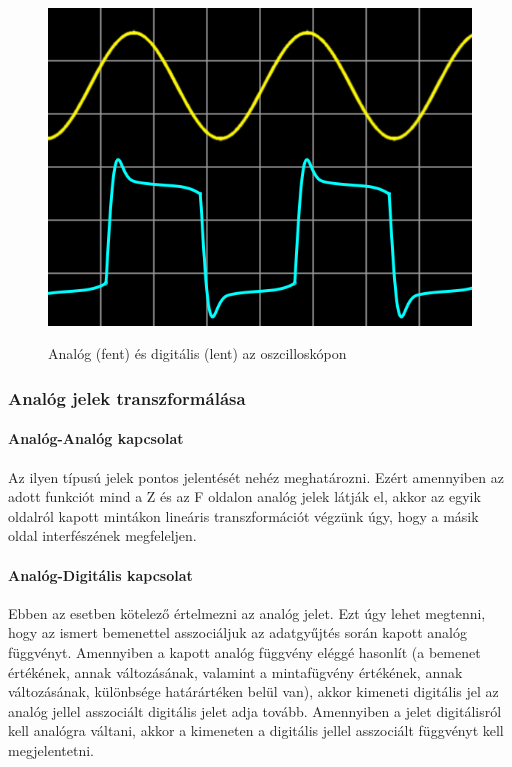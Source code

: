 \begin{figure}[H]
	\centering
	\includegraphics[width=0.5\linewidth]{img/oszcilloskóp.png}
    \cite{digital_vs_analog}
	\caption{Analóg (fent) és digitális (lent) az oszcilloskópon}
	\label{fig:oscilloszkop}
\end{figure}

\subsubsection{Analóg jelek transzformálása}
\paragraph{Analóg-Analóg kapcsolat}
Az ilyen típusú jelek pontos jelentését nehéz meghatározni. Ezért amennyiben az adott funkciót mind a Z és az F oldalon analóg jelek látják el, akkor az egyik oldalról kapott mintákon lineáris transzformációt végzünk úgy, hogy a másik oldal interfészének megfeleljen.
\paragraph{Analóg-Digitális kapcsolat}
Ebben az esetben kötelező értelmezni az analóg jelet. Ezt úgy lehet megtenni, hogy az ismert bemenettel asszociáljuk az adatgyűjtés során kapott analóg függvényt. Amennyiben a kapott analóg függvény eléggé hasonlít (a bemenet értékének, annak változásának, valamint a mintafügvény értékének, annak változásának, különbsége határártéken belül van), akkor kimeneti digitális jel az analóg jellel asszociált digitális jelet adja tovább. Amennyiben a jelet digitálisról kell analógra váltani, akkor a kimeneten a digitális jellel asszociált függvényt kell megjelentetni.

